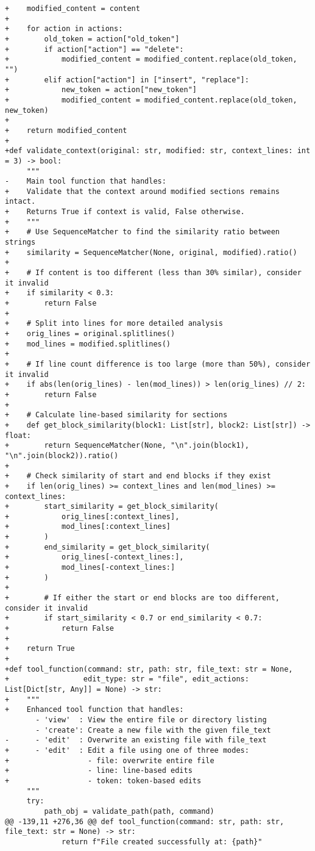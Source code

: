 \begin{lstlisting}[style=diffstyle]
+    modified_content = content
+
+    for action in actions:
+        old_token = action["old_token"]
+        if action["action"] == "delete":
+            modified_content = modified_content.replace(old_token, "")
+        elif action["action"] in ["insert", "replace"]:
+            new_token = action["new_token"]
+            modified_content = modified_content.replace(old_token, new_token)
+
+    return modified_content
+
+def validate_context(original: str, modified: str, context_lines: int = 3) -> bool:
     """
-    Main tool function that handles:
+    Validate that the context around modified sections remains intact.
+    Returns True if context is valid, False otherwise.
+    """
+    # Use SequenceMatcher to find the similarity ratio between strings
+    similarity = SequenceMatcher(None, original, modified).ratio()
+    
+    # If content is too different (less than 30% similar), consider it invalid
+    if similarity < 0.3:
+        return False
+
+    # Split into lines for more detailed analysis
+    orig_lines = original.splitlines()
+    mod_lines = modified.splitlines()
+
+    # If line count difference is too large (more than 50%), consider it invalid
+    if abs(len(orig_lines) - len(mod_lines)) > len(orig_lines) // 2:
+        return False
+
+    # Calculate line-based similarity for sections
+    def get_block_similarity(block1: List[str], block2: List[str]) -> float:
+        return SequenceMatcher(None, "\n".join(block1), "\n".join(block2)).ratio()
+
+    # Check similarity of start and end blocks if they exist
+    if len(orig_lines) >= context_lines and len(mod_lines) >= context_lines:
+        start_similarity = get_block_similarity(
+            orig_lines[:context_lines],
+            mod_lines[:context_lines]
+        )
+        end_similarity = get_block_similarity(
+            orig_lines[-context_lines:],
+            mod_lines[-context_lines:]
+        )
+        
+        # If either the start or end blocks are too different, consider it invalid
+        if start_similarity < 0.7 or end_similarity < 0.7:
+            return False
+
+    return True
+
+def tool_function(command: str, path: str, file_text: str = None,
+                 edit_type: str = "file", edit_actions: List[Dict[str, Any]] = None) -> str:
+    """
+    Enhanced tool function that handles:
       - 'view'  : View the entire file or directory listing
       - 'create': Create a new file with the given file_text
-      - 'edit'  : Overwrite an existing file with file_text
+      - 'edit'  : Edit a file using one of three modes:
+                  - file: overwrite entire file
+                  - line: line-based edits
+                  - token: token-based edits
     """
     try:
         path_obj = validate_path(path, command)
@@ -139,11 +276,36 @@ def tool_function(command: str, path: str, file_text: str = None) -> str:
             return f"File created successfully at: {path}"
 

\end{lstlisting}
